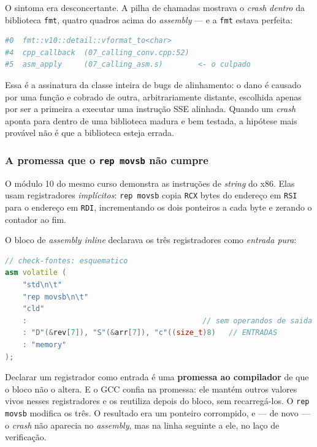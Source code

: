 \begin{armadilha}
O sintoma era desconcertante. A pilha de chamadas mostrava o \emph{crash}
\emph{dentro} da biblioteca \texttt{fmt}, quatro quadros acima do
\emph{assembly} --- e a \texttt{fmt} estava perfeita:

\begin{lstlisting}[style=bt, language=bash,
    caption={A pilha de chamadas do crash, como o depurador a mostrava.}]
#0  fmt::v10::detail::vformat_to<char>
#4  cpp_callback  (07_calling_conv.cpp:52)
#5  asm_apply     (07_calling_asm.s)        <- o culpado
\end{lstlisting}

Essa é a assinatura da classe inteira de bugs de alinhamento: o dano é causado
por uma função e cobrado de outra, arbitrariamente distante, escolhida apenas
por ser a primeira a executar uma instrução SSE alinhada. Quando um
\emph{crash} aponta para dentro de uma biblioteca madura e bem testada, a
hipótese mais provável não é que a biblioteca esteja errada.
\end{armadilha}

\subsubsection{A promessa que o \texttt{rep movsb} não cumpre}

O módulo 10 do mesmo curso demonstra as instruções de \emph{string} do x86.
Elas usam registradores \emph{implícitos}: \texttt{rep movsb} copia
\texttt{RCX} bytes do endereço em \texttt{RSI} para o endereço em \texttt{RDI},
incrementando os dois ponteiros a cada byte e zerando o contador ao fim.

O bloco de \emph{assembly inline} declarava os três registradores como
\emph{entrada pura}:

\begin{lstlisting}[style=bt, language=C++,
    caption={A forma anterior --- e errada. Ilustração; a versão corrigida está
             logo abaixo.}]
// check-fontes: esquematico
asm volatile (
    "std\n\t"
    "rep movsb\n\t"
    "cld"
    :                                        // sem operandos de saida
    : "D"(&rev[7]), "S"(&arr[7]), "c"((size_t)8)   // ENTRADAS
    : "memory"
);
\end{lstlisting}

Declarar um registrador como entrada é uma \textbf{promessa ao compilador} de
que o bloco não o altera. E o GCC confia na promessa: ele mantém outros valores
vivos nesses registradores e os reutiliza depois do bloco, sem recarregá-los. O
\texttt{rep movsb} modifica os três. O resultado era um ponteiro corrompido, e
--- de novo --- o \emph{crash} não aparecia no \emph{assembly}, mas na linha
seguinte a ele, no laço de verificação.

